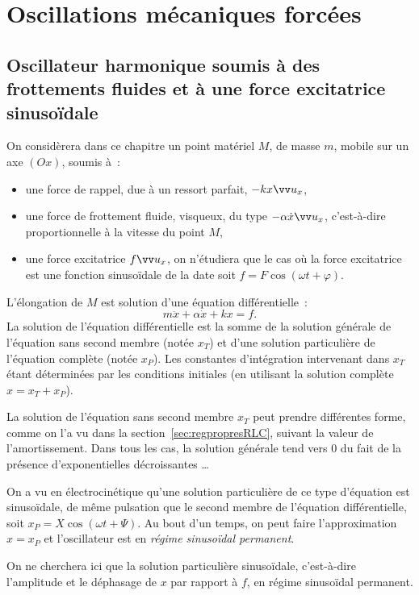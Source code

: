 \chapter{Oscillations mécaniques forcées}%
\minitoc{}
\minilof{}
\minilot{}

\section{Oscillateur harmonique soumis à des frottements fluides et à une force
excitatrice sinusoïdale}
On considèrera dans ce chapitre un point matériel \(M\), de masse \(m\), mobile
sur un axe \((Ox)\), soumis à~:
\begin{itemize}%
  \item une force de rappel, due à un ressort parfait, \(-kx \ux\),
  \item une force de frottement fluide, visqueux, du type \(-\alpha \dot{x}
    \ux\), c'est-à-dire proportionnelle à la vitesse du point \(M\),
  \item une force excitatrice \(f \ux\), on n'étudiera que le cas où la force
    excitatrice est une fonction sinusoïdale de la date soit \(f = F\cos(\omega
    t + \varphi)\).
\end{itemize}%
L'élongation de \(M\) est solution d'une équation différentielle~:
\begin{equation}%
  m\ddot{x}+\alpha\dot{x}+kx = f.
\end{equation}%
La solution de l'équation différentielle est la somme de la solution générale 
de
l'équation sans second membre (notée \(x_T\)) et d'une solution particulière de
l'équation complète (notée \(x_P\)). Les constantes d'intégration intervenant
dans \(x_T\) étant déterminées par les conditions initiales (en utilisant la
solution complète \(x = x_T+x_P\)).

La solution de l'équation sans second membre \(x_T\) peut prendre différentes
forme, comme on l'a vu dans la section~\ref{sec:regpropresRLC}, suivant la 
valeur
de l'amortissement. Dans tous les cas, la solution générale tend vers 0 du fait
de la présence d'exponentielles décroissantes \ldots

On a vu en électrocinétique qu'une solution particulière de ce type d'équation
est sinusoïdale, de même pulsation que le second membre de l'équation
différentielle, soit \(x_P = X\cos(\omega t + \Psi)\). Au bout d'un temps, on
peut faire l'approximation \(x = x_P\) et l'oscillateur est en \emph{régime
sinusoïdal permanent}.

On ne cherchera ici que la solution particulière sinusoïdale, c'est-à-dire
l'amplitude et le déphasage de \(x\) par rapport à \(f\), en régime sinusoïdal
permanent.

